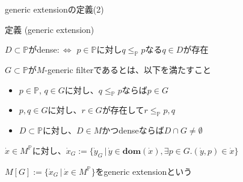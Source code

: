 \documentclass[17pt,aspectratio=169]{beamer}
\newcommand{\Pbb}{\mathbb{P}}
\begin{document}
\begin{frame}{generic extensionの定義(2)}
    \vspace{-7pt}
    \begin{itembox}[l]{定義 (generic extension)}
        {\small
            \vspace{-5pt}
            \textbullet $D \subset \Pbb$がdense$:\Leftrightarrow$ $p \in \Pbb$に対し$q \le_{\Pbb} p$なる$q \in D$が存在

            \vspace{4pt}
            \textbullet $G \subset \Pbb$が$M$-generic filterであるとは、以下を満たすこと
            \vspace{-5pt}
            \begin{itemize}[itemsep=0pt]
                \item [\textasteriskcentered]$p \in \Pbb$, $q \in G$に対し、$q \le_{\Pbb} p$ならば$p \in G$
                \item [\textasteriskcentered]$p, q \in G$に対し、$r \in G$が存在して$r \le_{\Pbb} p, q$
                \item [\textasteriskcentered]$D \subset \Pbb$に対し、$D \in M$かつdenseならば$D \cap G \neq \emptyset$
            \end{itemize}
            \vspace{-3pt}
            \textbullet $\dot{x} \in M^{\Pbb}$に対し、$\dot{x}_G := \{ \dot{y}_G \, | \, \dot{y} \in \bm{\mathbf{dom}}(\dot{x}), \exists p \in G. (\dot{y}, p) \in \dot{x} \}$ 

            \textbullet $M[G] := \{ \dot{x}_G \, | \, \dot{x} \in M^{\Pbb} \}$をgeneric extensionという
        }
    \end{itembox}    
\end{frame}
\end{document}
